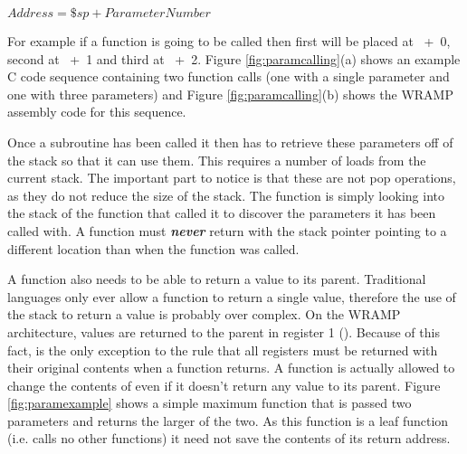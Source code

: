 \begin{center}
$Address = \$sp + ParameterNumber$\\
\end{center}

For example if a function  is going to
be called then first will be placed at \mbox{ + 0}, second
at \mbox{ + 1} and third at \mbox{ + 2}. Figure
\ref{fig:paramcalling}(a) shows an example C code sequence containing two
function calls (one with a single parameter and one with three
parameters) and Figure \ref{fig:paramcalling}(b) shows the WRAMP
assembly code for this sequence.

Once a subroutine has been called it then has to retrieve these
parameters off of the stack so that it can use them. This requires a
number of loads from the current stack. The important part to notice
is that these are not pop operations, as they do not reduce the size
of the stack. The function is simply looking into the stack of the
function that called it to discover the parameters it has been called
with. A function must \textbf{\emph{never}} return with the stack
pointer pointing to a different location than when the function was
called.

A function also needs to be able to return a value to its
parent. Traditional languages only ever allow a function to return a
single value, therefore the use of the stack to return a value is
probably over complex. On the WRAMP architecture, values are returned
to the parent in register 1 (). Because of this fact,
 is the only exception to the rule that all registers must be
returned with their original contents when a function returns. A
function is actually allowed to change the contents of  even
if it doesn't return any value to its parent. Figure
\ref{fig:paramexample} shows a simple maximum function that is passed
two parameters and returns the larger of the two. As this function is
a leaf function (i.e. calls no other functions) it need not save the
contents of its return address.

